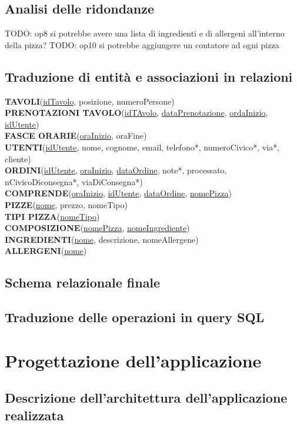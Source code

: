 \documentclass[a4paper,12pt, oneside]{article}
\begin{document}
\subsection{Analisi delle ridondanze}

TODO: op8 si potrebbe avere una lista di ingredienti e di allergeni all'interno della pizza?
TODO: op10 si potrebbe aggiungere un contatore ad ogni pizza

\subsection{Traduzione di entità e associazioni in relazioni}

\textbf{TAVOLI}(\underline{idTavolo}, posizione, numeroPersone) \\
\textbf{PRENOTAZIONI TAVOLO}(\underline{idTAvolo}, \underline{dataPrenotazione}, \underline{ordaInizio}, \underline{idUtente}) \\
\textbf{FASCE ORARIE}(\underline{oraInizio}, oraFine) \\
\textbf{UTENTI}(\underline{idUtente}, nome, cognome, email, telefono*, numeroCivico*, via*, cliente) \\
\textbf{ORDINI}(\underline{idUtente}, \underline{oraInizio}, \underline{dataOrdine}, note*, processato, nCivicoDiconsegna*, viaDiConsegna*) \\
\textbf{COMPRENDE}(\underline{oraInizio}, \underline{idUtente}, \underline{dataOrdine}, \underline{nomePizza}) \\
\textbf{PIZZE}(\underline{nome}, prezzo, nomeTipo) \\
\textbf{TIPI PIZZA}(\underline{nomeTipo}) \\
\textbf{COMPOSIZIONE}(\underline{nomePizza}, \underline{nomeIngrediente}) \\
\textbf{INGREDIENTI}(\underline{nome}, descrizione, nomeAllergene) \\
\textbf{ALLERGENI}(\underline{nome}) \\

\subsection{Schema relazionale finale}
\subsection{Traduzione delle operazioni in query SQL}

\section{Progettazione dell'applicazione}
\subsection{Descrizione dell'architettura dell'applicazione realizzata}
\end{document}
